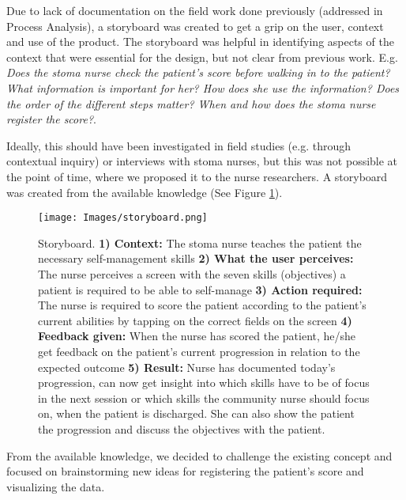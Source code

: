 
Due to lack of documentation on the field work done previously (addressed in Process Analysis), a storyboard was created to get a grip on the user, context and use of the product. The storyboard was helpful in identifying aspects of the context that were essential for the design, but not clear from previous work. E.g. \textit{Does the stoma nurse check the patient's score before walking in to the patient? What information is important for her? How does she use the information? Does the order of the different steps matter? When and how does the stoma nurse register the score?}. 

Ideally, this should have been investigated in field studies (e.g. through contextual inquiry) or interviews with stoma nurses, but this was not possible at the point of time, where we proposed it to the nurse researchers. A storyboard was created from the available knowledge (See Figure \ref{fig:storyboard}). 

\begin{figure}[!h] \centering
			\texttt{[image: Images/storyboard.png]}
		\caption{Storyboard. \textbf{1) Context:} The stoma nurse teaches the patient the necessary self-management skills \textbf{2) What the user perceives:} The nurse perceives a screen with the seven skills (objectives) a patient is required to be able to self-manage \textbf{3) Action required:} The nurse is required to score the patient according to the patient's current abilities by tapping on the correct fields on the screen \textbf{4) Feedback given:} When the nurse has scored the patient, he/she get feedback on the patient's current progression in relation to the expected outcome \textbf{5) Result:} Nurse has documented today's progression, can now get insight into which skills have to be of focus in the next session or which skills the community nurse should focus on, when the patient is discharged. She can also show the patient the progression and discuss the objectives with the patient.} \label{fig:storyboard}
\end{figure}
 


From the available knowledge, we decided to challenge the existing concept and focused on brainstorming new ideas for registering the patient's score and visualizing the data. 



